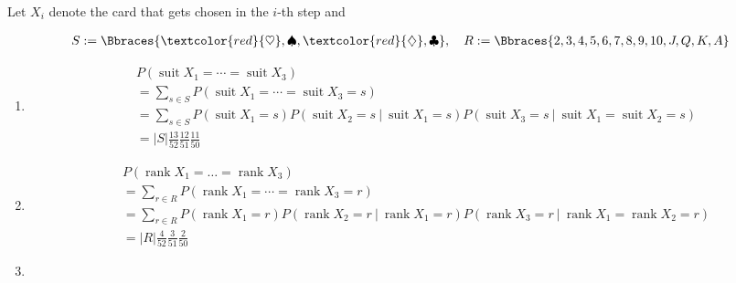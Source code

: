 \begin{solution}

Let $X_i$ denote the card that gets chosen in the $i$-th step and

\begin{align*}
    S := \Bbraces{\textcolor{red}{\heartsuit}, \spadesuit, \textcolor{red}{\diamondsuit}, \clubsuit},
    \quad
    R := \Bbraces{2, 3, 4, 5, 6, 7, 8, 9, 10, J, Q, K, A}
\end{align*}

\begin{enumerate}[label = (\alph*)]

    \item

    \begin{align*}
        &
        P(\operatorname{suit} X_1 = \cdots = \operatorname{suit} X_3) \\
        & =
        \sum_{s \in S} P(\operatorname{suit} X_1 = \cdots = \operatorname{suit} X_3 = s) \\
        & =
        \sum_{s \in S} P(\operatorname{suit} X_1 = s) P(\operatorname{suit} X_2 = s ~|~ \operatorname{suit} X_1 = s) P(\operatorname{suit} X_3 = s ~|~ \operatorname{suit} X_1 = \operatorname{suit} X_2 = s) \\
        & =
        |S| \frac{13}{52} \frac{12}{51} \frac{11}{50}
    \end{align*}

    \item

    \begin{align*}
        &
        P(\operatorname{rank} X_1 = \dots = \operatorname{rank} X_3) \\
        & =
        \sum_{r \in R} P(\operatorname{rank} X_1 = \cdots = \operatorname{rank} X_3 = r) \\
        & =
        \sum_{r \in R} P(\operatorname{rank} X_1 = r) P(\operatorname{rank} X_2 = r ~|~ \operatorname{rank} X_1 = r) P(\operatorname{rank} X_3 = r ~|~ \operatorname{rank} X_1 = \operatorname{rank} X_2 = r) \\
        & =
        |R| \frac{4}{52} \frac{3}{51} \frac{2}{50}
    \end{align*}

    \item


\end{enumerate}
\end{solution}
